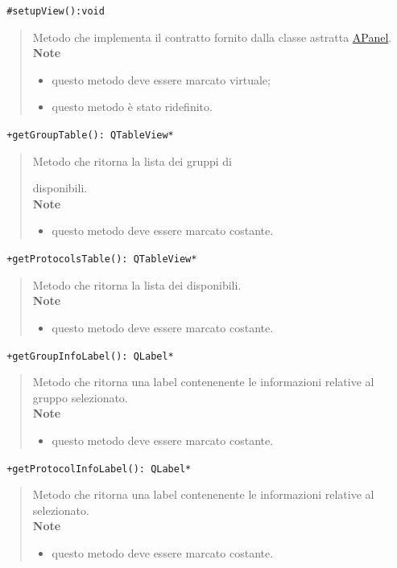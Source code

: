 \color{blue}\verb! #setupView():void!
\begin{quote}
\color{black}Metodo che implementa il contratto fornito dalla classe astratta \hyperref[speAPanel]{APanel}.\\
 \textbf{Note}
 \begin{itemize}
 \item questo metodo deve essere marcato virtuale;
 \item questo metodo è stato ridefinito.
 \end{itemize}
\end{quote}
\color{blue}\verb! +getGroupTable(): QTableView*!
\begin{quote}
\color{black} Metodo che ritorna la lista dei gruppi di \subject{} disponibili.  \\
 \textbf{Note}
 \begin{itemize}
 \item questo metodo deve essere marcato costante.
 \end{itemize}
\end{quote}
\color{blue}\verb! +getProtocolsTable(): QTableView*!
\begin{quote}
\color{black} Metodo che ritorna la lista dei \protocol{} disponibili.\\
 \textbf{Note}
 \begin{itemize}
 \item questo metodo deve essere marcato costante.
 \end{itemize}
\end{quote} 
\color{blue}\verb! +getGroupInfoLabel(): QLabel*!
\begin{quote}
\color{black} Metodo che ritorna una label contenenente le informazioni relative al gruppo selezionato.  \\
 \textbf{Note}
 \begin{itemize}
 \item questo metodo deve essere marcato costante.
 \end{itemize}
\end{quote}
\color{blue}\verb! +getProtocolInfoLabel(): QLabel*!
\begin{quote}
\color{black} Metodo che ritorna una label contenenente le informazioni relative al \protocol{} selezionato.  \\
 \textbf{Note}
 \begin{itemize}
 \item questo metodo deve essere marcato costante.
 \end{itemize}
\end{quote}
